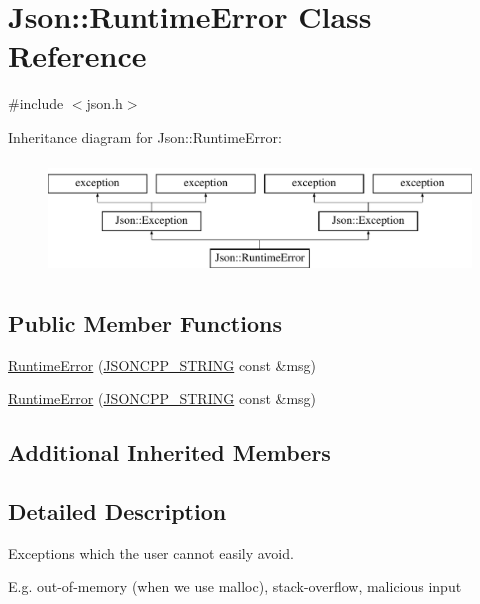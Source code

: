 \hypertarget{class_json_1_1_runtime_error}{}\section{Json\+:\+:Runtime\+Error Class Reference}
\label{class_json_1_1_runtime_error}


{\ttfamily \#include $<$json.\+h$>$}

Inheritance diagram for Json\+:\+:Runtime\+Error\+:\begin{figure}[H]
\begin{center}
\leavevmode
\includegraphics[height=3.000000cm]{class_json_1_1_runtime_error}
\end{center}
\end{figure}
\subsection*{Public Member Functions}
\begin{DoxyCompactItemize}
\item 
\hyperlink{class_json_1_1_runtime_error_a0f6445dc345ce0a703610b6e893fee40}{Runtime\+Error} (\hyperlink{config_8h_a1e723f95759de062585bc4a8fd3fa4be}{J\+S\+O\+N\+C\+P\+P\+\_\+\+S\+T\+R\+I\+NG} const \&msg)
\item 
\hyperlink{class_json_1_1_runtime_error_a0f6445dc345ce0a703610b6e893fee40}{Runtime\+Error} (\hyperlink{config_8h_a1e723f95759de062585bc4a8fd3fa4be}{J\+S\+O\+N\+C\+P\+P\+\_\+\+S\+T\+R\+I\+NG} const \&msg)
\end{DoxyCompactItemize}
\subsection*{Additional Inherited Members}


\subsection{Detailed Description}
Exceptions which the user cannot easily avoid.

E.\+g. out-\/of-\/memory (when we use malloc), stack-\/overflow, malicious input

